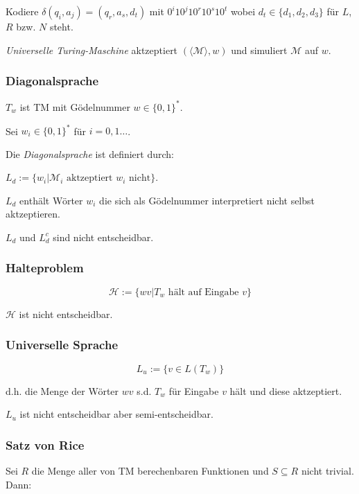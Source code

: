 \spacing

Kodiere $\delta(q_i,a_j) = (q_r,a_s,d_t)$ mit $0^i10^j10^r10^s10^t$ wobei $d_t \in \{d_1,d_2,d_3\}$ für $L$, $R$ bzw. $N$ steht.

\spacing

\emph{Universelle Turing-Maschine} aktzeptiert $(\langle \mathcal{M} \rangle, w)$ und simuliert $\mathcal{M}$ auf $w$.

\subsubsection*{Diagonalsprache}

$T_w$ ist TM mit Gödelnummer $w \in \{0,1\}^*$.

Sei $w_i \in \{0,1\}^*$ für $i = 0,1\dots$.

\spacing

Die \emph{Diagonalsprache} ist definiert durch:

$L_d := \{ w_i | \mathcal{M}_i \text{ aktzeptiert } w_i \text{ nicht} \}$.

$L_d$ enthält Wörter $w_i$ die sich als Gödelnummer interpretiert nicht selbst aktzeptieren.

\spacing

$L_d$ und $L_d^c$ sind nicht entscheidbar.

\subsubsection*{Halteproblem}

\[ \mathcal{H} := \{ wv | T_w \text{ hält auf Eingabe } v \} \]

$\mathcal{H}$ ist nicht entscheidbar.

\subsubsection*{Universelle Sprache}

\[ L_u := \{ v \in L(T_w) \} \]

d.h. die Menge der Wörter $wv$ s.d. $T_w$ für Eingabe $v$ hält und diese aktzeptiert.

$L_u$ ist nicht entscheidbar aber semi-entscheidbar.

\subsubsection*{Satz von Rice}

Sei $R$ die Menge aller von TM berechenbaren Funktionen und $S \subseteq R$ nicht trivial. Dann:

